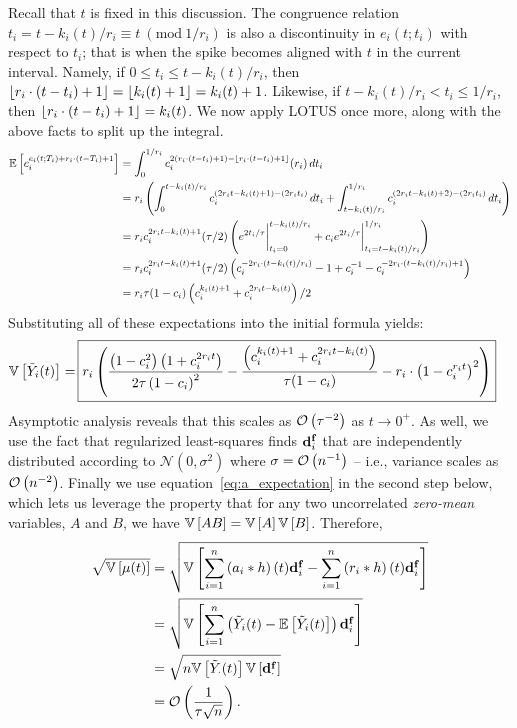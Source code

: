 Recall that $t$ is fixed in this discussion.
The congruence relation \mbox{$t_i = t - k_i(t)/r_i \equiv t \ (\text{mod}\ 1/r_i)$} is also a discontinuity in $e_i(t; t_i)$ with respect to $t_i$; that is when the spike becomes aligned with $t$ in the current interval.
Namely, if $0 \le t_i \le t - k_i(t)/r_i$, then $\lfloor {r_i \cdot (t - t_i) + 1} \rfloor = \lfloor {k_i(t) + 1} \rfloor = k_i(t) + 1$. Likewise, if $t - k_i(t)/r_i < t_i \le 1/r_i$, then $\lfloor {r_i \cdot (t - t_i) + 1} \rfloor = k_i(t)$.
We now apply LOTUS once more, along with the above facts to split up the integral.
\begin{align*}
\mathbb{E}\left[{ c_i^{e_i(t; T_i) + r_i \cdot (t - T_i) + 1} }\right] &= \int_0^{1/r_i} c_i^{2(r_i \cdot (t - t_i) + 1) - \lfloor {r_i \cdot (t - t_i) + 1} \rfloor} (r_i) \, dt_i \\
&= r_i \left( \int_0^{t - k_i(t)/r_i} c_i ^ {(2r_i t - k_i(t) + 1) - (2r_i t_i)} \, dt_i + \int_{t - k_i(t)/r_i}^{1/r_i} c_i^{(2r_i t - k_i(t) + 2) - (2r_i t_i)} \, dt_i \right) \\
&= r_i c_i^{2r_i t - k_i(t) + 1} (\tau / 2) \left( e^{2t_i / \tau} \bigg|_{t_i=0}^{t - k_i(t)/r_i} + c_i e^{2t_i / \tau} \bigg|_{t_i=t - k_i(t)/r_i}^{1/r_i} \right) \\
&= r_i c_i^{2r_i t - k_i(t) + 1} (\tau / 2) \left( c_i^{-2 r_i \cdot (t - k_i(t)/r_i)} - 1 + c_i^{-1} - c_i^{-2r_i \cdot (t - k_i(t)/r_i) + 1} \right) \\
&= r_i \tau (1 - c_i) \left(c_i^{k_i(t) + 1} + c_i^{2r_i t - k_i(t)} \right) / 2
\end{align*}
Substituting all of these expectations into the initial formula yields:
\begin{align*}
\variance{\tilde{Y}_i(t)} = \, \Aboxed{ r_i \left( \frac{\left(1 - c_i^2 \right)\left(1 + c_i^{2r_i t}\right)}{2\tau \left(1 - c_i \right)^2} - \frac{\left( c_i^{k_i(t) + 1} + c_i^{2r_i t - k_i(t)} \right)}{\tau(1 - c_i)} - r_i \cdot \left(1 - c_i^{r_i t} \right)^2 \right) }
\end{align*}
Asymptotic analysis reveals that this scales as $\mathcal{O}\left({\tau^{-2}}\right)$ as $t \rightarrow 0^+$.
As well, we use the fact that regularized least-squares finds
$\mathbf{d}_i^{\mathbf{f}}$ that are independently distributed according to $\mathcal{N}(0, \sigma^2)$ where $\sigma = \mathcal{O}\left({n^{-1}}\right)$ -- i.e., variance scales as $\mathcal{O}\left({n^{-2}}\right)$.
Finally we use equation~\ref{eq:a_expectation} in the second step below, which lets us leverage the property that for any two uncorrelated \emph{zero-mean} variables, $A$ and $B$, we have $\mathbb{V}\left[{AB}\right] = \mathbb{V}\left[{A}\right]\mathbb{V}\left[{B}\right]$.
Therefore,
\begin{equation}
\begin{aligned}
\sqrt{ \mathbb{V}\left[{ \mathbf{\mu}(t) }\right] } &= \sqrt{ \mathbb{V}\left[{\sum_{i=1}^n \left(a_i \ast h \right)(t) \mathbf{d}^{\mathbf{f}}_i- \sum_{i=1}^n \left( r_i \ast h \right)(t) \mathbf{d}^{\mathbf{f}}_i}\right] } \\
&= \sqrt{ \mathbb{V}\left[{\sum_{i=1}^n \left( \tilde{Y}_i(t) - \mathbb{E}\left[{ \tilde{Y}_i(t) }\right] \right) \mathbf{d}^{\mathbf{f}}_i }\right] } \\
&= \sqrt{ n \mathbb{V}\left[{\tilde{Y}_\cdot(t)}\right] \mathbb{V}\left[{\mathbf{d}^{\mathbf{f}}_\cdot}\right]} \\
&= \mathcal{O}\left({ \frac{1}{\tau \sqrt{n}} }\right) \text{.}
\end{aligned}
\end{equation}
